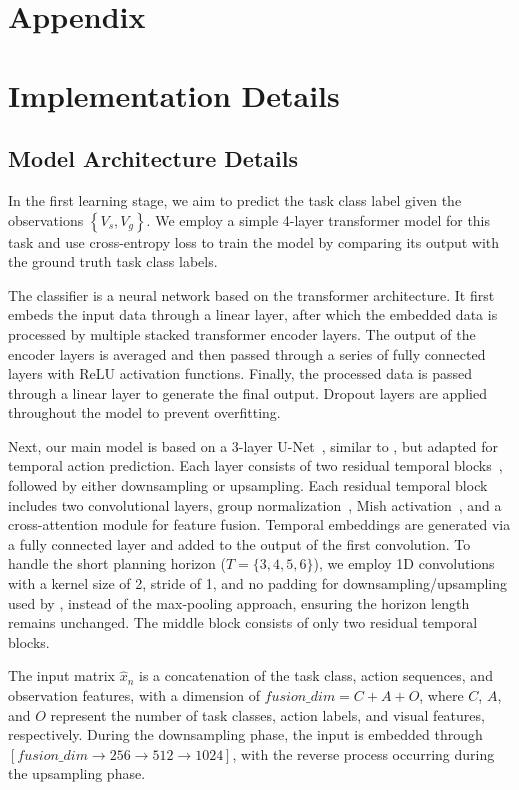 \section*{Appendix}
\appendix
\section{Implementation Details}
\subsection{Model Architecture Details} 

In the first learning stage, we aim to predict the task class label given the observations $\left\{V_s, V_g\right\}$. We employ a simple 4-layer transformer model for this task and use cross-entropy loss to train the model by comparing its output with the ground truth task class labels.

The classifier is a neural network based on the transformer architecture. It first embeds the input data through a linear layer, after which the embedded data is processed by multiple stacked transformer encoder layers. The output of the encoder layers is averaged and then passed through a series of fully connected layers with ReLU activation functions. Finally, the processed data is passed through a linear layer to generate the final output. Dropout layers are applied throughout the model to prevent overfitting. 

Next, our main model is based on a 3-layer U-Net~\citep{ronneberger2015u}, similar to \citet{wang2023pdpp}, but adapted for temporal action prediction. Each layer consists of two residual temporal blocks~\citep{he2016deep}, followed by either downsampling or upsampling. Each residual temporal block includes two convolutional layers, group normalization~\citep{wu2018group}, Mish activation~\citep{misra2019mish}, and a cross-attention module for feature fusion. Temporal embeddings are generated via a fully connected layer and added to the output of the first convolution. To handle the short planning horizon ($T = \{3, 4, 5, 6\}$), we employ 1D convolutions with a kernel size of 2, stride of 1, and no padding for downsampling/upsampling used by \citet{wang2023pdpp}, instead of the max-pooling approach, ensuring the horizon length remains unchanged. The middle block consists of only two residual temporal blocks.

The input matrix $\hat{x}_n$ is a concatenation of the task class, action sequences, and observation features, with a dimension of $fusion\_dim = C + A + O$, where $C$, $A$, and $O$ represent the number of task classes, action labels, and visual features, respectively. During the downsampling phase, the input is embedded through $[fusion\_dim \to 256 \to 512 \to 1024]$, with the reverse process occurring during the upsampling phase.

